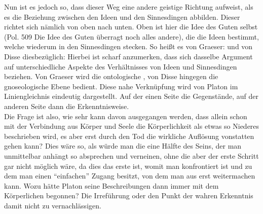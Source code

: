 Nun ist es jedoch so, dass dieser Weg eine andere geistige Richtung aufweist, als es die Beziehung zwischen den Ideen und den Sinnesdingen abbilden.
Dieser richtet sich nämlich von oben nach unten. Oben ist hier die Idee des Guten selbst (Pol. 509 Die Idee des Guten überragt noch alles andere), die die Ideen bestimmt, welche wiederum in den Sinnesdingen stecken. So heißt es von Graeser: 
 und von Disse diesbezüglich:
Hierbei ist scharf anzumerken, dass sich dasselbe Argument auf unterschiedliche Aspekte des Verhältnisses von Ideen und Sinnesdingen beziehen. Von Graeser wird die ontologische , von Disse hingegen die gnoseologische Ebene bedient. Diese nahe Verknüpfung wird von Platon im Liniengleichnis eindeutig dargestellt. Auf der einen Seite die Gegenstände, auf der anderen Seite dann die Erkenntnisweise.\\
Die Frage ist also, wie sehr kann davon ausgegangen werden, dass allein schon mit der Verbindung aus Körper und Seele die Körperlichkeit als etwas so Niederes beschrieben wird, es aber erst durch den Tod die wirkliche Auflösung vonstatten gehen kann? Dies wäre so, als würde man die eine Hälfte des Seins, der man unmittelbar anhängt so absprechen und verneinen, ohne die aber der erste Schritt gar nicht möglich wäre, da dies das erste ist, womit man konfrontiert ist und zu dem man einen \enquote{einfachen} Zugang besitzt, von dem man aus erst weitermachen kann. Wozu hätte Platon seine Beschreibungen dann immer mit dem Körperlichen begonnen? Die Irreführung oder den Punkt der wahren Erkenntnis damit nicht zu vernachlässigen.
